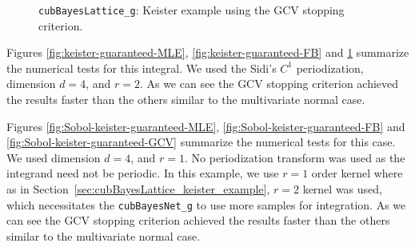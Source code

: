 \documentclass{iitthesis}          %
\newcommand{\code}[1]{\texttt{#1}}
\newcommand\secref{Section~\ref}
\begin{document}
{{{{{{\begin{figure}
	\caption[Lattice: Keister guaranteed: GCV]{\code{cubBayesLattice\_g}: Keister example using the GCV stopping criterion.}
	\label{fig:keister-guaranteed-GCV}
\end{figure}
Figures \ref{fig:keister-guaranteed-MLE}, \ref{fig:keister-guaranteed-FB} and \ref{fig:keister-guaranteed-GCV} summarize the numerical tests for this integral.  We used the Sidi's $C^1$ periodization, dimension $d=4$, and $r=2$. 
As we can see the GCV stopping criterion achieved the results faster than the others similar to the multivariate normal case.

\Subsection{Using \code{cubBayesNet\_g}}
Figures \ref{fig:Sobol-keister-guaranteed-MLE}, \ref{fig:Sobol-keister-guaranteed-FB} and \ref{fig:Sobol-keister-guaranteed-GCV} summarize the numerical tests for this case. We used  dimension $d=4$, and $r=1$.  No periodization transform was used as the integrand need not be periodic. 
In this example, we use $r=1$ order kernel where as in \secref{sec:cubBayesLattice_keister_example}, $r=2$ kernel was used, which necessitates
the \code{cubBayesNet\_g} to use more samples for integration.
As we can see the GCV stopping criterion achieved the results faster than the others similar to the multivariate normal case.

}}}}}}
\end{document}
